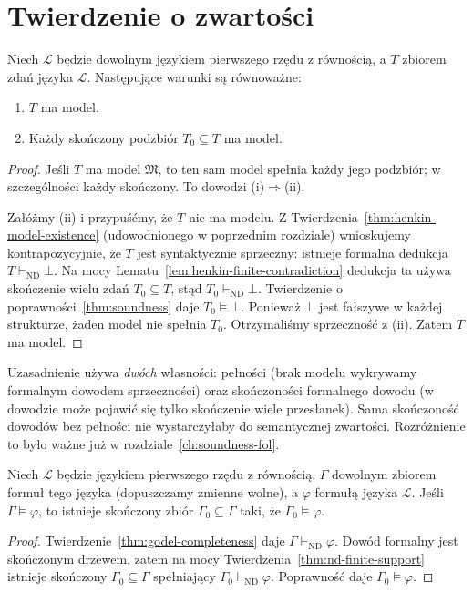 \section{Twierdzenie o zwartości}\label{sec:compactness-main}
\begin{twierdzenie}\label{thm:compactness}
Niech $\mathcal L$ będzie dowolnym językiem pierwszego rzędu z równością, a $T$ zbiorem zdań języka $\mathcal L$. Następujące warunki są równoważne:
\begin{enumerate}[label=(\roman*)]
\item $T$ ma model.
\item Każdy skończony podzbiór $T_0\subseteq T$ ma model.
\end{enumerate}
\end{twierdzenie}
\begin{proof}
Jeśli $T$ ma model $\mathfrak M$, to ten sam model spełnia każdy jego podzbiór; w szczególności każdy skończony. To dowodzi (i)$\Rightarrow$(ii).

Załóżmy (ii) i przypuśćmy, że $T$ nie ma modelu. Z Twierdzenia~\ref{thm:henkin-model-existence} (udowodnionego w poprzednim rozdziale) wnioskujemy kontrapozycyjnie, że $T$ jest syntaktycznie sprzeczny: istnieje formalna dedukcja $T\vdash_{\mathrm{ND}}\bot$. Na mocy Lematu~\ref{lem:henkin-finite-contradiction} dedukcja ta używa skończenie wielu zdań $T_0\subseteq T$, stąd $T_0\vdash_{\mathrm{ND}}\bot$. Twierdzenie o poprawności~\ref{thm:soundness} daje $T_0\models\bot$. Ponieważ $\bot$ jest fałszywe w każdej strukturze, żaden model nie spełnia $T_0$. Otrzymaliśmy sprzeczność z (ii). Zatem $T$ ma model.
\end{proof}

\begin{uwaga}
Uzasadnienie używa \emph{dwóch} własności: pełności (brak modelu wykrywamy formalnym dowodem sprzeczności) oraz skończoności formalnego dowodu (w dowodzie może pojawić się tylko skończenie wiele przesłanek). Sama skończoność dowodów bez pełności nie wystarczyłaby do semantycznej zwartości. Rozróżnienie to było ważne już w rozdziale~\ref{ch:soundness-fol}.
\end{uwaga}

\begin{twierdzenie}\label{thm:compactness-finite-entailment}
Niech $\mathcal L$ będzie językiem pierwszego rzędu z równością, $\Gamma$ dowolnym zbiorem formuł tego języka (dopuszczamy zmienne wolne), a $\varphi$ formułą języka $\mathcal L$. Jeśli $\Gamma\models\varphi$, to istnieje skończony zbiór $\Gamma_0\subseteq\Gamma$ taki, że $\Gamma_0\models\varphi$.
\end{twierdzenie}
\begin{proof}
Twierdzenie~\ref{thm:godel-completeness} daje $\Gamma\vdash_{\mathrm{ND}}\varphi$. Dowód formalny jest skończonym drzewem, zatem na mocy Twierdzenia~\ref{thm:nd-finite-support} istnieje skończony $\Gamma_0\subseteq\Gamma$ spełniający $\Gamma_0\vdash_{\mathrm{ND}}\varphi$. Poprawność daje $\Gamma_0\models\varphi$.
\end{proof}

